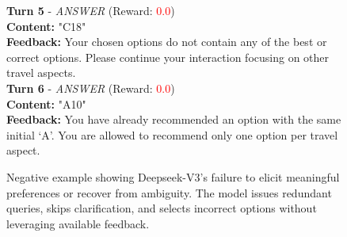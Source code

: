 \begin{figure}[t]
{\begin{tcolorbox}[colback=red!3!white, colframe=red!75!black, 
title=Bad Example - Deepseek-V3 (Travel-22), boxrule=0.3mm, width=\textwidth, arc=3mm, auto outer arc=true]
\textbf{Turn 5} - \textit{ANSWER} (Reward: \textcolor{red}{0.0})\\
\textbf{Content:} "C18"\\
\textbf{Feedback:} Your chosen options do not contain any of the best or correct options. Please continue your interaction focusing on other travel aspects.\\

\textbf{Turn 6} - \textit{ANSWER} (Reward: \textcolor{red}{0.0})\\
\textbf{Content:} "A10"\\
\textbf{Feedback:} You have already recommended an option with the same initial ‘A’. You are allowed to recommend only one option per travel aspect.\\

\end{tcolorbox}
}
\caption{Negative example showing Deepseek-V3's failure to elicit meaningful preferences or recover from ambiguity. The model issues redundant queries, skips clarification, and selects incorrect options without leveraging available feedback.}
\label{fig:bad_deepseek-v3}
\end{figure}
